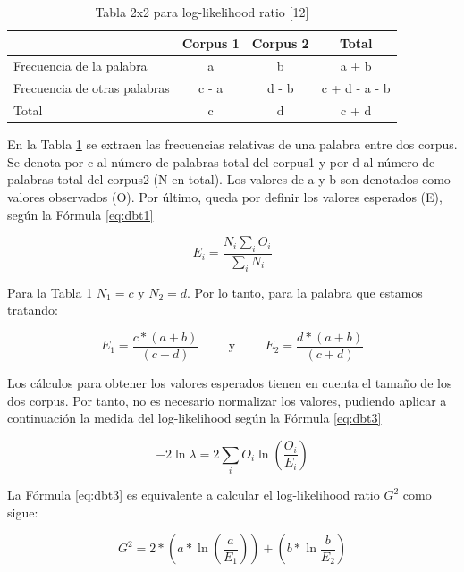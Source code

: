 \begin{table}
  \centering
  \begin{tabular}{|l|c|c|c|}
    \hline
     & Corpus 1 & Corpus 2 & Total \\
    \hline
    Frecuencia de la palabra & a & b & a + b \\
    \hline
    Frecuencia de otras palabras & c - a & d - b & c + d - a - b \\
    \hline
    Total & c & d & c + d \\
    \hline
  \end{tabular}
  \caption{Tabla 2x2 para log-likelihood ratio [12]}
  \label{tab:log_likelihood}
\end{table}

En la Tabla \ref{tab:log_likelihood} se extraen las frecuencias relativas de una palabra entre dos corpus. Se denota por c al número de palabras total del corpus1 y por d al número de palabras total del corpus2 (N en total). Los valores de a y b son denotados como valores observados (O). Por último, queda por definir los valores esperados (E), según la Fórmula \ref{eq:dbt1}

\begin{equation}
  E_i=\frac{N_i\displaystyle\sum_{i}^{} O_i}{\displaystyle\sum_{i}^{} N_i}
  \label{eq:dbt1}
\end{equation}

Para la Tabla \ref{tab:log_likelihood} $N_1 = c$ y $N_2 = d$. Por lo tanto, para la palabra que estamos tratando:

\begin{equation}
  E_1=\frac{c*(a+b)}{(c+d)}\hspace{1cm} \text{y}\hspace{1cm} E_2=\frac{d*(a+b)}{(c+d)}
  \label{eq:dbt2}
\end{equation}

Los cálculos para obtener los valores esperados tienen en cuenta el tamaño de los dos corpus. Por tanto, no es necesario normalizar los valores, pudiendo aplicar a continuación la medida del log-likelihood según la Fórmula \ref{eq:dbt3}

\begin{equation}
  -2\ln\lambda=2\displaystyle\sum_{i}^{} O_i\ln \left(\frac{O_i}{E_i}\right)
  \label{eq:dbt3}
\end{equation}

La Fórmula  \ref{eq:dbt3} es equivalente a calcular el log-likelihood ratio $G^2$ como sigue:

\begin{equation}
  G^2=2*\left(a*\ln \left(\frac{a}{E_1}\right)\right)+\left(b*\ln \frac{b}{E_2}\right)
  \label{eq:dbt4}
\end{equation}

